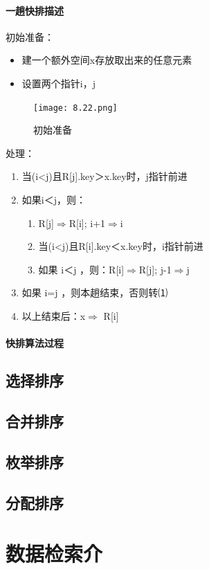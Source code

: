 \documentclass[AutoFakeBold]{LZUThesis2007}
\begin{document}
			\subsubsection{一趟快排描述}
初始准备：
\begin{itemize}
	\item 建一个额外空间x存放取出来的任意元素
	\item 设置两个指针i，j
\end{itemize}
\begin{figure}[H]
    \centering
    \texttt{[image: 8.22.png]}
    \caption{初始准备}
    \label{fig_install_texlive}
\end{figure}
处理：
\begin{enumerate}
	\item 当(i<j)且R[j].key＞x.key时，j指针前进
	\item 如果i＜j，则：
\begin{enumerate}
	\item R[j]$\Rightarrow$R[i];  i+1$\Rightarrow$i
	\item 当(i<j)且R[i].key＜x.key时，i指针前进
	\item 如果 i＜j ，则：R[i]$\Rightarrow$R[j];  j-1$\Rightarrow$j
\end{enumerate}
	\item 如果  i=j ，则本趟结束，否则转⑴
	\item 以上结束后：x$\Rightarrow$ R[i]
\end{enumerate}
			\subsubsection{快排算法过程}

	\section{选择排序}
	\section{合并排序}
	\section{枚举排序}
	\section{分配排序}

\chapter{数据检索介}
\end{document}

